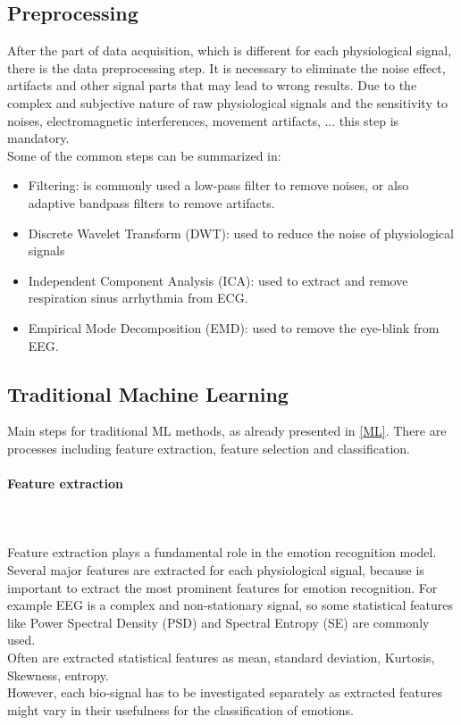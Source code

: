 \subsection{Preprocessing}
After the part of data acquisition, which is different for each physiological signal, there is the data preprocessing step. It is necessary to eliminate the noise effect, artifacts and other signal parts that may lead to wrong results. Due to the complex and subjective nature of raw physiological signals and the sensitivity to noises, electromagnetic interferences, movement artifacts, ... this step is mandatory.
\\ \indent
Some of the common steps can be summarized in:
\begin{itemize}
	\item Filtering: is commonly used a low-pass filter to remove noises, or also adaptive bandpass filters to remove artifacts.
	\item Discrete Wavelet Transform (DWT): used to reduce the noise of physiological signals
	\item Independent Component Analysis (ICA): used to extract and remove respiration sinus arrhythmia from ECG.
	\item Empirical Mode Decomposition (EMD): used to remove the eye-blink from EEG.
\end{itemize}

\subsection{Traditional Machine Learning}
Main steps for traditional ML methods, as already presented in \ref{ML}. There are processes including feature extraction, feature selection and classification.

\paragraph{Feature extraction}
\mbox{} \\ \\ \indent
Feature extraction plays a fundamental role in the emotion recognition model. Several major features are extracted for each physiological signal, because is important to extract the most prominent features for emotion recognition. For example EEG is a complex and non-stationary signal, so some statistical features like Power Spectral Density (PSD) and Spectral Entropy (SE) are commonly used.
\\
Often are extracted statistical features as mean, standard deviation, Kurtosis, Skewness, entropy.
\\
However, each bio-signal has to be investigated separately as extracted features might vary in their usefulness for the classification of emotions.

